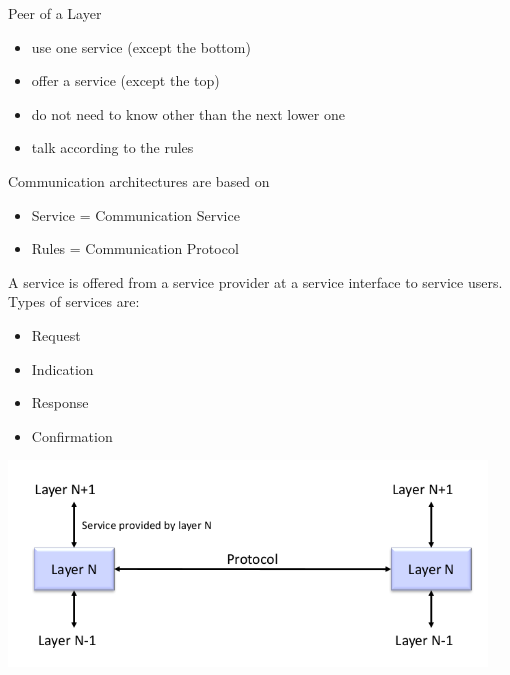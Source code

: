 \documentclass[11pt,ngerman]{article}
\begin{document}
Peer	of	a	Layer
\begin{itemize}[noitemsep]
\item
use	one	service	
(except	the	bottom)
\item
offer	a	service	
(except	the	top)
\item
do	not	need	to	know	other	
than	the	next	lower	one
\item
talk	according	to	the	rules
\end{itemize}

Communication	architectures	are	based	on
\begin{itemize}[noitemsep]
\item  Service	=	Communication	Service
\item Rules	=	Communication	Protocol

\end{itemize}
A	service	is	offered	from	a	service	provider at	a	service	interface	
to	service	users.\\
Types	of	services	are:
\begin{itemize}[noitemsep]
\item Request
\item Indication
\item Response
\item Confirmation
\end{itemize}

\includegraphics[width=5in]{images/Selection_007.png}\\
\end{document}
